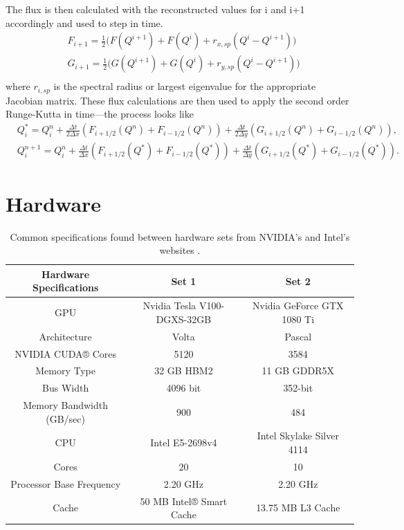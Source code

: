 \documentclass[preprints,article,accept,moreauthors,pdftex]{Definitions/mdpi}
\def\oldCPU{Intel Skylake Silver 4114} %
\def\oldGPU{Nvidia GeForce GTX 1080 Ti}
\def\newCPU{Intel E5-2698v4} %
\def\newGPU{Nvidia Tesla V100-DGXS-32GB}
\begin{document}
The flux is then calculated with the reconstructed values for i and i+1 accordingly and used to step in time.
\begin{align*}
    &F_{i+1} = \frac{1}{2}\big( F(Q^{i+1})+F(Q^{i})+r_{x,sp}(Q^{i}-Q^{i+1})\big)\\
    &G_{i+1} = \frac{1}{2}\big( G(Q^{i+1})+G(Q^{i})+r_{y,sp}(Q^{i}-Q^{i+1})\big)\\
\end{align*}
where $r_{i,sp}$ is the spectral radius or largest eigenvalue for the appropriate Jacobian matrix. These flux calculations are then used to apply the second order Runge-Kutta in time---the process looks like
\begin{align*}
    &Q_i^{*} = Q_i^{n}+\frac{\Delta t}{2\Delta x}(F_{i+1/2}(Q^n)+F_{i-1/2}(Q^n))+\frac{\Delta t}{2\Delta y}(G_{i+1/2}(Q^n)+G_{i-1/2}(Q^n)),\\
    &Q_i^{n+1} = Q_i^{n}+\frac{\Delta t}{\Delta x}(F_{i+1/2}(Q^*)+F_{i-1/2}(Q^*))+\frac{\Delta t}{\Delta y}(G_{i+1/2}(Q^*)+G_{i-1/2}(Q^*)).
\end{align*}


\section{Hardware}
\label{Hardware}
\begin{table}[htb!]
\begin{center}
\begin{tabular}{ |c|c|c| } 

 \hline
 Hardware Specifications & Set 1 & Set 2 \\
 \hline
 GPU & \newGPU{} & \oldGPU{} \\
 Architecture   & Volta &  Pascal \\
 NVIDIA CUDA® Cores  & 5120 &  3584 \\
 Memory Type   & 32 GB HBM2 &  11 GB GDDR5X \\
 Bus Width    & 4096 bit &  352-bit \\
 Memory Bandwidth (GB/sec)  & 900 &  484 \\ 
 \hline
 CPU & \newCPU{} & \oldCPU{} \\ 
 Cores & 20 & 10 \\
 Processor Base Frequency & 2.20 GHz & 2.20 GHz \\
 Cache & 50 MB Intel® Smart Cache & 13.75 MB L3 Cache\\
 \hline
\end{tabular}
\end{center}
\caption{\label{hardwareTable} Common specifications found between hardware sets from NVIDIA's and Intel's websites \cite{Intel123550,Intel91753,GeForceGeForce,NVIDIANVIDIA}.}
\end{table}
\end{document}
